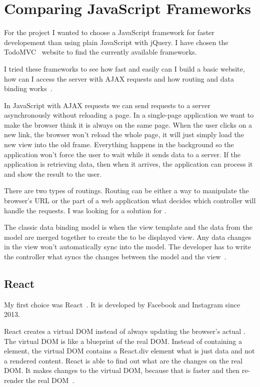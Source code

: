 \chapter{Comparing JavaScript Frameworks}

For the project I wanted to choose a JavaScript framework for faster developement than using plain JavaScript with jQuery. I have chosen the TodoMVC~\cite{TodoMVC} website to find the currently available frameworks. 

I tried these frameworks to see how fast and easily can I build a basic website, how can I access the server with AJAX requests and how routing and data binding works~. 

In JavaScript with AJAX requests we can send requests to a server asynchronously without reloading a page. In a single-page application we want to make the browser think it is always on the same page. When the user clicks on a new link, the browser won't reload the whole page, it will just simply load the new view into the old frame. Everything happens in the background so the application won't force the user to wait while it sends data to a server. If the application is retrieving data, then when it arrives, the application can process it and show the result to the user.

There are two types of routings. Routing can be either a way to manipulate the browser's URL or the part of a web application what decides which controller will handle the requests. I was looking for a solution for .

The classic data binding model is when the view template and the data from the model are merged together to create the to be displayed view. Any data changes in the view won't automatically sync into the model. The developer has to write the controller what syncs the changes between the model and the view~\cite{Angular-Developer-DataBinding}.


\section{React}

My first choice was React~\cite{React}. It is developed by Facebook and Instagram since 2013.

React creates a virtual DOM instead of always updating the browser's actual . The virtual DOM is like a blueprint of the real DOM. Instead of containing a  element, the virtual DOM contains a React.div element what is just data and not a rendered content. React is able to find out what are the changes on the real DOM. It makes changes to the virtual DOM, because that is faster and then re-render the real DOM~\cite{React-Virtual-DOM}.

